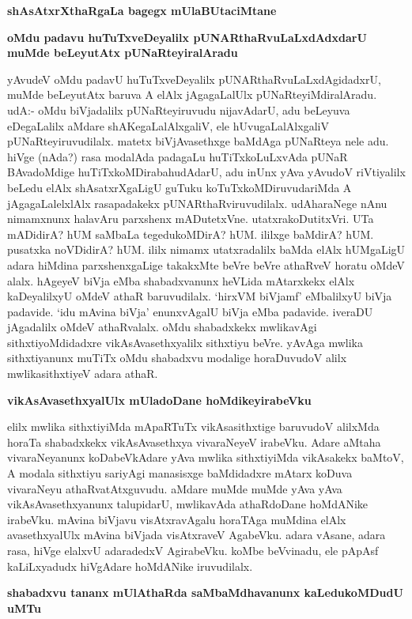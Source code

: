 \medskip
\begin{center}
{\bf\Large{shAsAtxrXthaRgaLa bagegx mUlaBUtaciMtane}}
\end{center}

\noindent
{\bf\large{oMdu padavu huTuTxveDeyalilx pUNARthaRvuLaLxdAdxdarU muMde beLeyutAtx pUNaRteyiralAradu}}\label{page177}

yAvudeV oMdu padavU huTuTxveDeyalilx pUNARthaRvuLaLxdAgidadxrU, muMde beLeyutAtx baruva A elAlx jAgagaLalUlx pUNaRteyiMdiralAradu. udA:- oMdu biVjadalilx pUNaRteyiruvudu nijavAdarU, adu beLeyuva eDegaLalilx aMdare shAKegaLalAlxgaliV, ele hUvugaLalAlxgaliV pUNaRteyiruvudilalx. matetx biVjAvasethxge baMdAga pUNaRteya nele adu. hiVge (nAda?) rasa modalAda padagaLu huTiTxkoLuLxvAda pUNaR BAvadoMdige huTiTxkoMDirabahudAdarU, adu inUnx yAva yAvudoV riVtiyalilx beLedu elAlx shAsatxrXgaLigU guTuku koTuTxkoMDiruvudariMda A jAgagaLalelxlAlx rasapadakekx pUNARthaRviruvudilalx. udAharaNege nAnu nimamxnunx halavAru parxshenx mADutetxVne. utatxrakoDutitxVri. UTa mADidirA? hUM saMbaLa tegedukoMDirA? hUM. ililxge baMdirA? hUM. pusatxka noVDidirA? hUM. ililx nimamx utatxradalilx baMda elAlx hUMgaLigU adara hiMdina parxshenxgaLige takakxMte beVre beVre athaRveV horatu oMdeV alalx. hAgeyeV biVja eMba shabadxvanunx heVLida mAtarxkekx elAlx kaDeyalilxyU oMdeV athaR baruvudilalx. `hirxVM biVjamf' eMbalilxyU biVja padavide. `idu mAvina biVja' enunxvAgalU biVja eMba padavide. iveraDU jAgadalilx oMdeV athaRvalalx. oMdu shabadxkekx mwlikavAgi sithxtiyoMdidadxre vikAsAvasethxyalilx sithxtiyu beVre. yAvAga mwlika sithxtiyanunx muTiTx oMdu shabadxvu modalige horaDuvudoV alilx mwlikasithxtiyeV adara athaR.

\noindent
{\bf\large{vikAsAvasethxyalUlx mUladoDane hoMdikeyirabeVku}}\label{page178}

elilx mwlika sithxtiyiMda mApaRTuTx vikAsasithxtige baruvudoV alilxMda horaTa shabadxkekx vikAsAvasethxya vivaraNeyeV irabeVku. Adare aMtaha vivaraNeyanunx koDabeVkAdare yAva mwlika sithxtiyiMda vikAsakekx baMtoV, A modala sithxtiyu sariyAgi manasisxge baMdidadxre mAtarx koDuva vivaraNeyu athaRvatAtxguvudu. aMdare muMde muMde yAva yAva vikAsAvasethxyanunx talupidarU, mwlikavAda athaRdoDane hoMdANike irabeVku. mAvina biVjavu visAtxravAgalu horaTAga muMdina elAlx avasethxyalUlx mAvina biVjada visAtxraveV AgabeVku. adara vAsane, adara rasa, hiVge elalxvU adaradedxV AgirabeVku. koMbe beVvinadu, ele pApAsf kaLiLxyadudx hiVgAdare hoMdANike iruvudilalx.

\noindent
{\bf\large{shabadxvu tananx mUlAthaRda saMbaMdhavanunx kaLedukoMDudU uMTu}}

